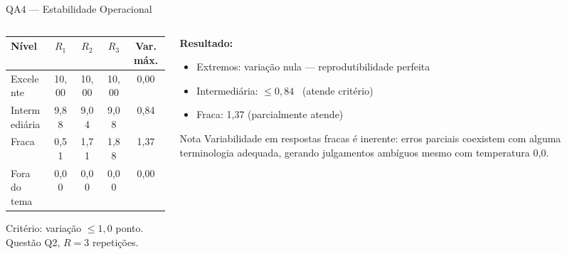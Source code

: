 \documentclass[10pt,aspectratio=169]{beamer}
\begin{document}
\begin{frame}{QA4 — Estabilidade Operacional}
  \begin{columns}[T]
    \begin{column}{0.55\textwidth}
      \begin{center}
        \small
        \begin{tabular}{lcccc}
          \toprule
          \textbf{Nível} & $R_1$ & $R_2$ & $R_3$ & \textbf{Var. máx.} \\
          \midrule
          Excelente      & 10,00 & 10,00 & 10,00 & 0,00 \\
          Intermediária  & 9,88  & 9,04  & 9,08  & \alert{0,84} \\
          Fraca          & 0,51  & 1,71  & 1,88  & 1,37 \\
          Fora do tema   & 0,00  & 0,00  & 0,00  & 0,00 \\
          \bottomrule
        \end{tabular}
      \end{center}
      \vspace{0.3em}
      \small Critério: variação $\leq 1{,}0$ ponto. Questão Q2, $R=3$ repetições.
    \end{column}
    \begin{column}{0.41\textwidth}
      \textbf{Resultado:}
      \begin{itemize}
        \item Extremos: \alert{variação nula} — reprodutibilidade perfeita
        \item Intermediária: $\leq 0{,}84$ \checkmark\ (atende critério)
        \item Fraca: 1,37 (parcialmente atende)
      \end{itemize}
      \vspace{0.4em}
      \begin{block}{Nota}
        Variabilidade em respostas fracas é inerente: erros parciais coexistem com alguma terminologia adequada, gerando julgamentos ambíguos mesmo com temperatura 0,0.
      \end{block}
    \end{column}
  \end{columns}
\end{frame}
\end{document}
